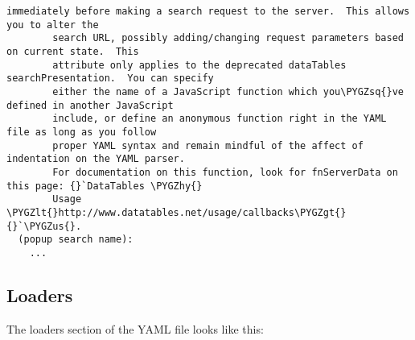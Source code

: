 \documentclass[letterpaper,10pt,english]{sphinxmanual}
\def\PYGZus{\char`\_}
\def\PYGZlt{\char`\<}
\def\PYGZgt{\char`\>}
\def\PYGZhy{\char`\-}
\def\PYGZsq{\char`\'}
\renewcommand\PYGZsq{\textquotesingle}
\begin{document}
\begin{Verbatim}[commandchars=\\\{\}]
        immediately before making a search request to the server.  This allows you to alter the
        search URL, possibly adding/changing request parameters based on current state.  This
        attribute only applies to the deprecated dataTables searchPresentation.  You can specify
        either the name of a JavaScript function which you\PYGZsq{}ve defined in another JavaScript
        include, or define an anonymous function right in the YAML file as long as you follow
        proper YAML syntax and remain mindful of the affect of indentation on the YAML parser.
        For documentation on this function, look for fnServerData on this page: {}`DataTables \PYGZhy{}
        Usage \PYGZlt{}http://www.datatables.net/usage/callbacks\PYGZgt{}{}`\PYGZus{}.
  (popup search name):
    ...
\end{Verbatim}


\subsection{Loaders}
\label{jaxFrameworkGuide:loaders}
The loaders section of the YAML file looks like this:
\end{document}
